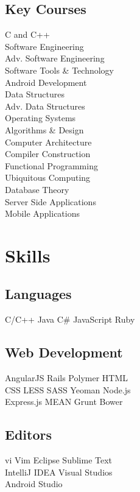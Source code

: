 \documentclass[]{deedy-resume-openfont}
\begin{document}
\begin{minipage}[t]{0.33\textwidth}
\subsection{Key Courses}
C and C++ \\
Software Engineering \\
Adv. Software Engineering \\
Software Tools \& Technology \\
Android Development \\
Data Structures \\
Adv. Data Structures \\
Operating Systems \\
Algorithms \& Design \\
Computer Architecture \\
Compiler Construction \\
Functional Programming \\
Ubiquitous Computing \\
Database Theory \\
Server Side Applications \\
Mobile Applications
\sectionsep


\section{Skills}
\subsection{Languages}
C/C++ \textbullet{} Java \textbullet{} C\# \textbullet{} JavaScript \textbullet{} Ruby \\ 
\subsection{Web Development}
AngularJS \textbullet{} Rails \textbullet{} Polymer \textbullet{} HTML \\ CSS
\textbullet{} LESS \textbullet{} SASS \textbullet{} Yeoman \textbullet{} Node.js \\
Express.js \textbullet{} MEAN \textbullet{} Grunt \textbullet{} Bower \\
\subsection{Editors}
vi \textbullet{} Vim \textbullet{} Eclipse \textbullet{} Sublime Text \\
IntelliJ IDEA \textbullet{} Visual Studios \\ Android Studio

\end{minipage}
\end{document}
